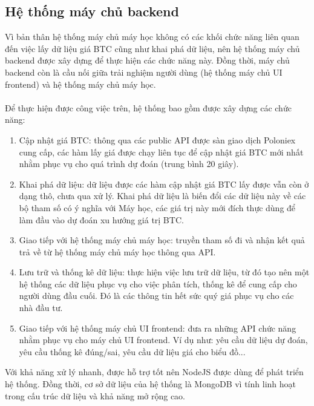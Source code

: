 \subsection{ Hệ thống máy chủ backend}
Vì bản thân hệ thống máy chủ máy học không có các khối chức năng liên quan đến 
việc lấy dữ liệu giá BTC cũng như khai phá dữ liệu, nên hệ thống máy chủ backend 
được xây dựng để thực hiện các chức năng này. Đồng thời, máy chủ backend còn là 
cầu nối giữa trải nghiệm người dùng (hệ thống máy chủ UI frontend) và hệ thống 
máy chủ máy học.\\\\
Để thực hiện được công việc trên, hệ thống bao gồm được xây dựng các chức năng:
\begin{enumerate}
\item Cập nhật giá BTC: thông qua các public API được sàn giao dịch Poloniex 
cung cấp, các hàm lấy giá được chạy liên tục để cập nhật giá BTC mới nhất nhằm 
phục vụ cho quá trình dự đoán (trung bình 20 giây).
\item Khai phá dữ liệu: dữ liệu được các hàm cập nhật giá BTC lấy được vẫn 
còn ở dạng thô, chưa qua xử lý. Khai phá dữ liệu là biến đổi các dữ liệu này 
về các bộ tham số có ý nghĩa với Máy học, các giá trị này mới đích thực 
dùng để làm đầu vào dự đoán xu hướng giá trị BTC.
\item Giao tiếp với hệ thống máy chủ máy học: truyền tham số đi và nhận 
kết quả trả về từ hệ thống máy chủ máy học thông qua API.
\item Lưu trữ và thống kê dữ liệu: thực hiện việc lưu trữ dữ liệu, từ đó tạo 
nên một hệ thống các dữ liệu phục vụ cho việc phân tích, thống kê để cung cấp 
cho người dùng đầu cuối. Đó là các thông tin hết sức quý giá phục vụ cho các 
nhà đầu tư.
\item Giao tiếp với hệ thống máy chủ UI frontend: đưa ra những API chức năng 
nhằm phục vụ cho máy chủ UI frontend. Ví dụ như: yêu cầu dữ liệu dự đoán, yêu 
cầu thống kê đúng/sai, yêu cầu dữ liệu giá cho biểu đồ...
\end{enumerate}
Với khả năng xử lý nhanh, được hỗ trợ tốt nên NodeJS được dùng để phát triển 
hệ thống. Đồng thời, cơ sở dữ liệu của hệ thống là MongoDB vì tính linh hoạt 
trong cấu trúc dữ liệu và khả năng mở rộng cao.
